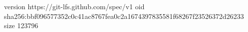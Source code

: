 version https://git-lfs.github.com/spec/v1
oid sha256:bbf096577352c0c41ac8767fea0c2a1674397835581f68267f23526372d26233
size 123796
